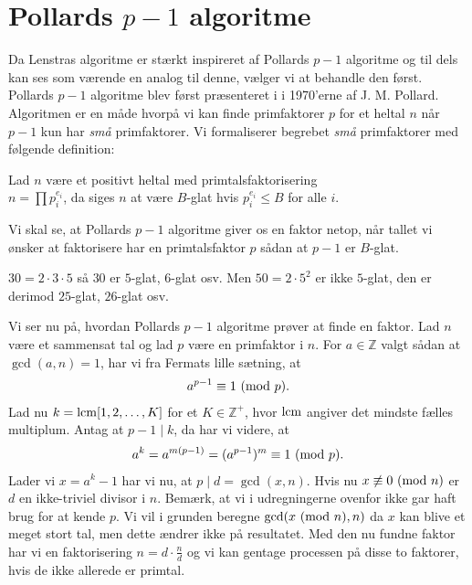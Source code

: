 \section{Pollards $p-1$ algoritme}
Da Lenstras algoritme er stærkt inspireret af Pollards $p-1$ algoritme og til dels kan ses som værende en analog til denne, vælger vi at behandle den først. Pollards $p-1$ algoritme blev først præsenteret i \cite{Pollard} i 1970'erne af J. M. Pollard. Algoritmen er en måde hvorpå vi kan finde primfaktorer $p$ for et heltal $n$ når $p-1$ kun har \textit{små} primfaktorer. Vi formaliserer begrebet \textit{små} primfaktorer med følgende definition:

\begin{definition}
Lad $n$ være et positivt heltal med primtalsfaktorisering \\ $n=\prod p_{i}^{e_i}$, da siges $n$ at være $B$-glat hvis $p_{i}^{e_i} \leq B$ for alle $i$.
\end{definition}
Vi skal se, at Pollards $p-1$ algoritme giver os en faktor netop, når tallet vi ønsker at faktorisere har en primtalsfaktor $p$ sådan at $p-1$ er $B$-glat.
\begin{example}
$30 = 2 \cdot 3 \cdot 5$ så $30$ er $5$-glat, $6$-glat osv.	Men $50 = 2 \cdot 5^2$ er ikke $5$-glat, den er derimod $25$-glat, $26$-glat osv.
\end{example}
Vi ser nu på, hvordan Pollards $p-1$ algoritme prøver at finde en faktor. Lad $n$ være et sammensat tal og lad $p$ være en primfaktor i $n$. For $a \in \mathbb{Z}$ valgt sådan at $\gcd(a, n)=1$, har vi fra Fermats lille sætning, at 
\begin{align*}
	a^{p-1} \equiv 1 \ (\mathrm{mod} \ p).
\end{align*}
Lad nu $k= \mathrm{lcm}[1, 2, \ldots, K]$ for et $K \in \mathbb{Z}^{+}$, hvor $\mathrm{lcm}$ angiver det mindste fælles multiplum. Antag at $p-1 \mid k$, da har vi videre, at
\begin{align*}
	a^{k} = a^{m(p-1)} = (a^{p-1})^m \equiv 1 \ (\mathrm{mod} \ p).
\end{align*}
Lader vi $x = a^{k} - 1$ har vi nu, at $p \mid d = \gcd(x, n)$. Hvis nu $x \not \equiv 0 \ (\mathrm{mod} \ n)$ er $d$ en ikke-triviel divisor i $n$. Bemærk, at vi i udregningerne ovenfor ikke gar haft brug for at kende $p$. Vi vil i grunden beregne $\gcd(x \ (\mathrm{mod} \ n), n)$ da $x$ kan blive et meget stort tal, men dette ændrer ikke på resultatet. Med den nu fundne faktor har vi en faktorisering $n=d \cdot \frac{n}{d}$ og vi kan gentage processen på disse to faktorer, hvis de ikke allerede er primtal. 

